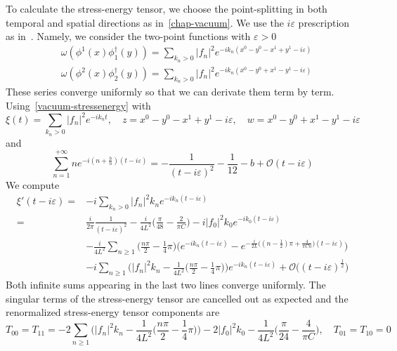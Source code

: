 To calculate the stress-energy tensor, we choose the point-splitting in both temporal and spatial directions as in~\cref{chap-vacuum}.
We use the $i\varepsilon$ prescription as in~\cite{Zahn2017}.
Namely,
we consider the two-point functions with $\varepsilon >0$
\begin{equation*}
\begin{split}
& \omega(\phi^1(x)\phi_1^\dagger(y)) = 
 \sum_{k_n>0} |f_n|^2 e^{-ik_n(x^0 - y^0 - x^1 + y^1-i\varepsilon)} \\
& \omega(\phi^2(x)\phi_2^\dagger(y)) =
\sum_{k_n>0} |f_n|^2 e^{-ik_n(x^0 - y^0 + x^1 - y^1-i\varepsilon)}
\end{split}
\end{equation*}
These series converge uniformly so that we can derivate them term by term.
%
Using~\cref{vacuum-stressenergy} with 
\begin{equation*}
\xi(t) = \sum_{k_n>0} |f_n|^2 e^{-ik_n t} ,  \quad
z = x^0 - y^0 - x^1 + y^1-i\varepsilon  ,\quad
w = x^0 - y^0 + x^1 - y^1-i\varepsilon
\end{equation*}
and
\begin{equation*}
\sum_{n=1}^{+\infty} n e^{-i(n+\frac b n )(t - i\varepsilon)}
= -\frac{1}{(t-i\varepsilon)^2} - \frac{1}{12}-b + \mathcal{O}(t-i\varepsilon)
\end{equation*}
We compute
\begin{equation*}
\begin{split}
\xi'(t  - i\varepsilon)  = & -i\sum_{k_n>0}|f_n|^2k_n e^{-ik_n(t-i\varepsilon)} \\
%
= & \frac{i}{2\pi}\frac{1}{(t-i\varepsilon)^2}  
-\frac{i}{4L^2}\big(\frac{\pi}{48} - \frac{2}{\pi C} \big)
- i |f_0|^2k_0e^{-ik_0(t-i\varepsilon)}
\\
% 
& -\frac{i}{4L^2}\sum_{n\geq1}\Big(\frac{n\pi}{2} - \frac 1 4 \pi\Big)
\bigg(e^{-ik_n(t-i\varepsilon)}
-e^{-\frac{i}{2L}\big((n-\frac 1 2 )\pi + \frac{4}{\pi C n} \big)(t-i\varepsilon)} \bigg) \\
&-i \sum_{n \geq 1} \Big( |f_n|^2 k_n - \frac{1}{4L^2}\big(\frac{n\pi}{2} - \frac 1 4 \pi \big) \Big) e^{-ik_n(t-i\varepsilon)}
+\mathcal{O}\big((t-i\varepsilon)^{\frac{1}{2}}\big)
\end{split}
\end{equation*}
Both infinite sums appearing in the last two lines converge uniformly.
The singular terms of the stress-energy tensor are cancelled out as expected and the renormalized stress-energy tensor components are
\begin{equation*}
T_{00} = T_{11}= - 2 \sum_{n \geq 1} \Big( |f_n|^2 k_n - 
\frac{1}{4L^2}\big(\frac{n\pi}{2} - \frac 1 4 \pi \big) \Big)
-2|f_0|^2k_0-\frac{1}{4L^2}\big(\frac{\pi}{24} - \frac{4}{\pi C}\big)
 , \quad
T_{01}=T_{10}  = 0
\end{equation*}
